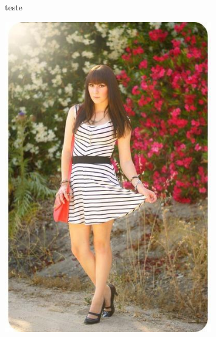\documentclass[12pt]{report}
\begin{document}
\begin{figure}
\begin{minipage}[b]{0.3\textwidth}
    \caption{}
  \end{minipage}
  \caption{teste}
  \label{fig:moda-seg}
\end{figure}

\begin{figure}
  \centering
  \begin{minipage}[b]{0.48\textwidth}
    \includegraphics[width=0.8\textwidth]{images/resultados/490842original.jpg}
    \caption{}
  \end{minipage}
  \hfill
  \begin{minipage}[b]{0.48\textwidth}

\end{minipage}
\end{figure}
\end{document}
